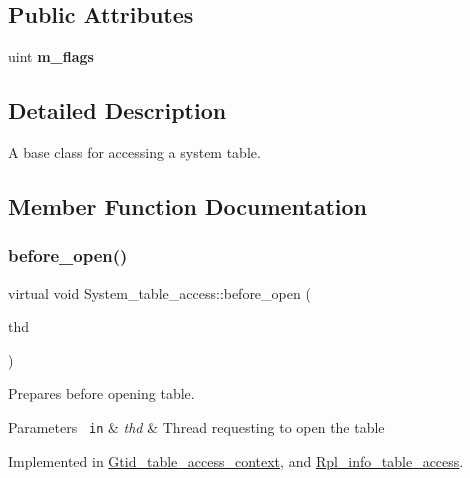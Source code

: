 \subsection*{Public Attributes}
\begin{DoxyCompactItemize}
\item 
\mbox{\label{classSystem__table__access_ad974ef5ecf6cfdd230afef9d02414070}} 
uint {\bfseries m\+\_\+flags}
\end{DoxyCompactItemize}


\subsection{Detailed Description}
A base class for accessing a system table. 

\subsection{Member Function Documentation}
\mbox{\label{classSystem__table__access_a7357c29323649f270cf35b08cd8fe826}} 
\subsubsection{\texorpdfstring{before\+\_\+open()}{before\_open()}}
{\footnotesize\ttfamily virtual void System\+\_\+table\+\_\+access\+::before\+\_\+open (\begin{DoxyParamCaption}\item[{T\+HD $\ast$}]{thd }\end{DoxyParamCaption})\hspace{0.3cm}{\ttfamily [pure virtual]}}

Prepares before opening table.


\begin{DoxyParams}[1]{Parameters}
\mbox{\texttt{ in}}  & {\em thd} & Thread requesting to open the table \\
\hline
\end{DoxyParams}


Implemented in \mbox{\hyperlink{classGtid__table__access__context_a2073456f19b6b9aa81cb7d874c4f2358}{Gtid\+\_\+table\+\_\+access\+\_\+context}}, and \mbox{\hyperlink{classRpl__info__table__access_a6d1ae1c8dce3fd9e3f8906acef95e9e3}{Rpl\+\_\+info\+\_\+table\+\_\+access}}.

